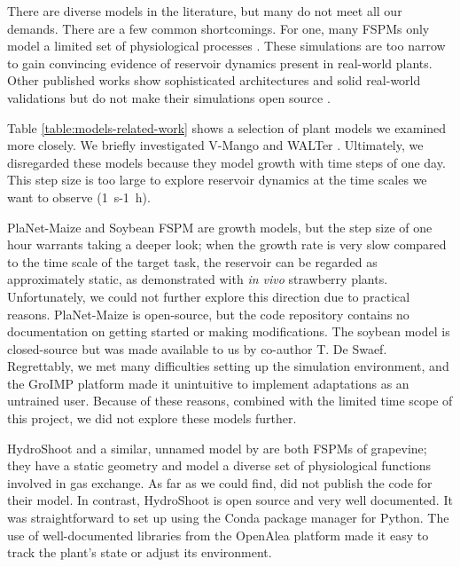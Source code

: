 
There are diverse models in the literature, but many do not meet all our demands.
There are a few common shortcomings.
For one, many FSPMs only model a limited set of physiological processes \citep{louarn_two_2020}.
These simulations are too narrow to gain convincing evidence of reservoir dynamics present in real-world plants.
Other published works show sophisticated architectures and solid real-world validations but do not make their simulations open source \citep{prieto_functionalstructural_2020}. 


Table \ref{table:models-related-work} shows a selection of plant models we examined more closely.
We briefly investigated V-Mango \citep{boudon_v-mango_2020} and WALTer \citep{lecarpentier_walter_2019}. Ultimately, we disregarded these models because they model growth with time steps of one day. 
This step size is too large to explore reservoir dynamics at the time scales we want to observe (\SI{1}{s}-\SI{1}{h}).

PlaNet-Maize \citep{lobet_modeling_2014} and Soybean FSPM \citep{coussement_turgor-driven_2020} are growth models, but the step size of one hour warrants taking a deeper look;
when the growth rate is very slow compared to the time scale of the target task, the reservoir can be regarded as approximately static, as \citet{pieters_reservoir_2022} demonstrated with \textit{in vivo} strawberry plants.
Unfortunately, we could not further explore this direction due to practical reasons.
PlaNet-Maize is open-source, but the code repository contains no documentation on getting started or making modifications.
The soybean model is closed-source but was made available to us by co-author T. De Swaef.
Regrettably, we met many difficulties setting up the simulation environment, and the GroIMP platform made it unintuitive to implement adaptations as an untrained user.
Because of these reasons, combined with the limited time scope of this project, we did not explore these models further.



HydroShoot \citep{albasha_hydroshoot_2019} and a similar, unnamed model by \citet{prieto_functionalstructural_2020} are both FSPMs of grapevine; they have a static geometry and model a diverse set of physiological functions involved in gas exchange.
As far as we could find, \citeauthor{prieto_functionalstructural_2020} did not publish the code for their model.
In contrast, HydroShoot is open source and very well documented.
It was straightforward to set up using the Conda package manager for Python. The use of well-documented libraries from the OpenAlea platform made it easy to track the plant's state or adjust its environment.

